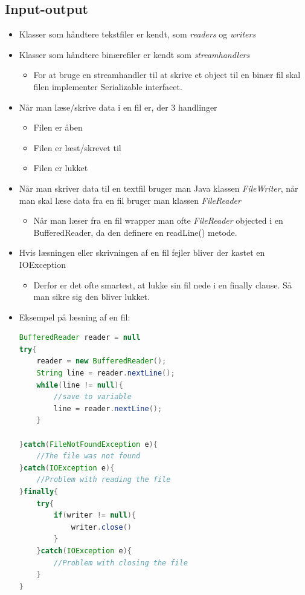 \documentclass{article}
\begin{document}
\subsection{Input-output}
\begin{itemize}
	\item Klasser som håndtere tekstfiler er kendt, som \textit{readers} og \textit{writers}
	\item Klasser som håndtere binærefiler er kendt som \textit{streamhandlers}
	\begin{itemize}
		\item For at bruge en streamhandler til at skrive et object til en binær fil skal filen implementer Serializable interfacet. 
	\end{itemize}
	\item Når man læse/skrive data i en fil er, der 3 handlinger
	\begin{itemize}
		\item Filen er åben
		\item Filen er læst/skrevet til
		\item Filen er lukket
	\end{itemize}
	\item Når man skriver data til en textfil bruger man Java klassen \textit{FileWriter}, når man skal læse data fra en fil bruger man klassen \textit{FileReader}
	\begin{itemize}
		\item Når man læser fra en fil wrapper man ofte \textit{FileReader} objected i en BufferedReader, da den definere en readLine() metode. 
	\end{itemize}
	\item Hvis læsningen eller skrivningen af en fil fejler bliver der kastet en IOException
	\begin{itemize}
		\item Derfor er det ofte smartest, at lukke sin fil nede i en finally clause. Så man sikre sig den bliver lukket. 
	\end{itemize}
	\item Eksempel på læsning af en fil:
\begin{lstlisting}[language=java]
BufferedReader reader = null
try{
	reader = new BufferedReader();
	String line = reader.nextLine();
	while(line != null){
		//save to variable
		line = reader.nextLine();
	}
	
}catch(FileNotFoundException e){
	//The file was not found
}catch(IOException e){
	//Problem with reading the file
}finally{
	try{
		if(writer != null){
			writer.close()
		}
	}catch(IOException e){
		//Problem with closing the file
	}
}
\end{lstlisting}
\end{itemize}
\end{document}
